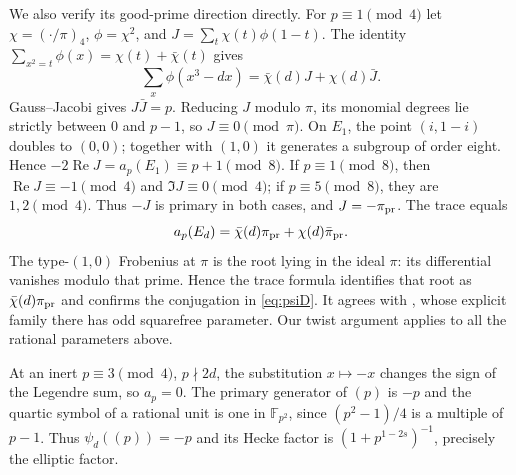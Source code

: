 \documentclass[11pt,a4paper]{article}
\numberwithin{equation}{section}
\theoremstyle{definition}
\theoremstyle{remark}
\newcommand{\Rea}{\operatorname{Re}}
\begin{document}
We also verify its good-prime direction directly. For $p\equiv1\pmod4$ let $\chi=(\cdot/\pi)_4$, $\phi=\chi^2$, and $J=\sum_t\chi(t)\phi(1-t)$. The identity
$\sum_{x^2=t}\phi(x)=\chi(t)+\bar\chi(t)$ gives
\[
 \sum_x\phi(x^3-dx)=\bar\chi(d)J+\chi(d)\bar J .
\]
Gauss--Jacobi gives $J\bar J=p$. Reducing $J$ modulo $\pi$, its monomial degrees lie strictly between $0$ and $p-1$, so $J\equiv0\pmod\pi$. On $E_1$, the point $(i,1-i)$ doubles to $(0,0)$; together with $(1,0)$ it generates a subgroup of order eight. Hence
$-2\Rea J=a_p(E_1)\equiv p+1\pmod8$.
If $p\equiv1\pmod8$, then $\Rea J\equiv-1\pmod4$ and $\Im J\equiv0\pmod4$; if $p\equiv5\pmod8$, they are $1,2\pmod4$. Thus $-J$ is primary in both cases, and $J=-\pi_{\rm pr}$. The trace equals
\[
 a_p(E_d)=\bar\chi(d)\pi_{\rm pr}
                         +\chi(d)\bar\pi_{\rm pr}.
\]
The type-$(1,0)$ Frobenius at $\pi$ is the root lying in the ideal $\pi$: its differential vanishes modulo that prime. Hence the trace formula identifies that root as $\bar\chi(d)\pi_{\rm pr}$ and confirms the conjugation in \eqref{eq:psiD}. It agrees with \cite[Sections 2.3--2.4, (2.13)--(2.16)]{DDW}, whose explicit family there has odd squarefree parameter. Our twist argument applies to all the rational parameters above.

At an inert $p\equiv3\pmod4$, $p\nmid2d$, the substitution $x\mapsto-x$ changes the sign of the Legendre sum, so $a_p=0$. The primary generator of $(p)$ is $-p$ and the quartic symbol of a rational unit is one in $\mathbb F_{p^2}$, since $(p^2-1)/4$ is a multiple of $p-1$. Thus $\psi_d((p))=-p$ and its Hecke factor is $(1+p^{1-2s})^{-1}$, precisely the elliptic factor.
\end{document}
